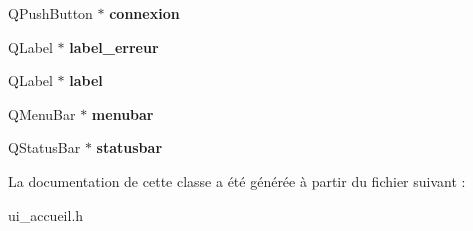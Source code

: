 \begin{DoxyCompactItemize}
\item 
\hypertarget{class_ui___accueil_ad2788d40c70fc8dfa383dffc0a4154f6}{Q\+Push\+Button $\ast$ {\bfseries connexion}}\label{class_ui___accueil_ad2788d40c70fc8dfa383dffc0a4154f6}

\item 
\hypertarget{class_ui___accueil_a091534b4cb2843c4fa3612d1904a4ccf}{Q\+Label $\ast$ {\bfseries label\+\_\+erreur}}\label{class_ui___accueil_a091534b4cb2843c4fa3612d1904a4ccf}

\item 
\hypertarget{class_ui___accueil_ac3e85d9e0f053129791a9364b5db0490}{Q\+Label $\ast$ {\bfseries label}}\label{class_ui___accueil_ac3e85d9e0f053129791a9364b5db0490}

\item 
\hypertarget{class_ui___accueil_ae6f38fc28687f9f3b367a574c9c9328e}{Q\+Menu\+Bar $\ast$ {\bfseries menubar}}\label{class_ui___accueil_ae6f38fc28687f9f3b367a574c9c9328e}

\item 
\hypertarget{class_ui___accueil_a158e3fd627f6d680fc2d890d540a2a4f}{Q\+Status\+Bar $\ast$ {\bfseries statusbar}}\label{class_ui___accueil_a158e3fd627f6d680fc2d890d540a2a4f}

\end{DoxyCompactItemize}


La documentation de cette classe a été générée à partir du fichier suivant \+:\begin{DoxyCompactItemize}
\item 
ui\+\_\+accueil.\+h\end{DoxyCompactItemize}
